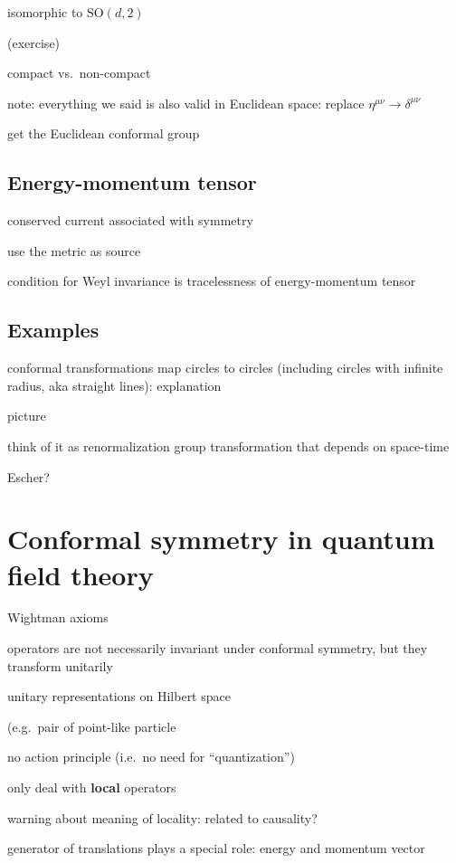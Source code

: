 \documentclass[a4paper,12pt]{article}
\newcommand{\SO}{\text{SO}}
\numberwithin{equation}{section}
\begin{document}
isomorphic to $\SO(d, 2)$

(exercise)

compact vs.~non-compact


note: everything we said is also valid in Euclidean space: replace $\eta^{\mu\nu} \to \delta^{\mu\nu}$

get the Euclidean conformal group


\subsection{Energy-momentum tensor}

conserved current associated with symmetry

use the metric as source

condition for Weyl invariance is tracelessness of energy-momentum tensor


\subsection{Examples}

conformal transformations map circles to circles (including circles with infinite radius, aka straight lines): explanation

picture

think of it as renormalization group transformation that depends on space-time

Escher?





\section{Conformal symmetry in quantum field theory}

Wightman axioms

operators are not necessarily invariant under conformal symmetry, but they transform unitarily

unitary representations on Hilbert space

(e.g.~pair of point-like particle

no action principle
(i.e.~no need for ``quantization'')


only deal with \textbf{local} operators

warning about meaning of locality: related to causality?



generator of translations plays a special role: energy and momentum vector
\end{document}
